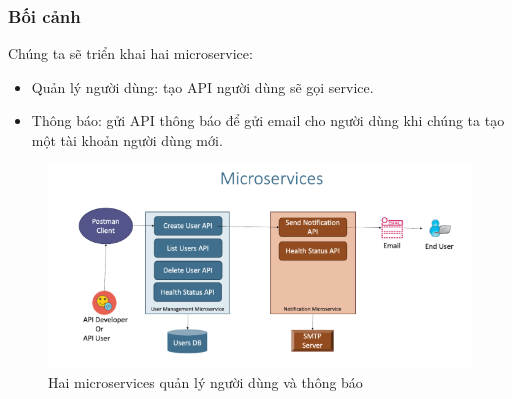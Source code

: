 \subsubsection{Bối cảnh}
\noindent Chúng ta sẽ triển khai hai microservice:
\begin{itemize}
    \item Quản lý người dùng: tạo API người dùng sẽ gọi service.
    \item Thông báo: gửi API thông báo để gửi email cho người dùng khi chúng ta tạo một tài khoản người dùng mới.
\end{itemize}
\begin{figure}[H]
    \begin{center}
    \includegraphics[scale=1]{images/hieu/chap-2/microservice.png}
    \vspace*{5mm}
    \caption{Hai microservices quản lý người dùng và thông báo}
    \end{center}
\end{figure}
